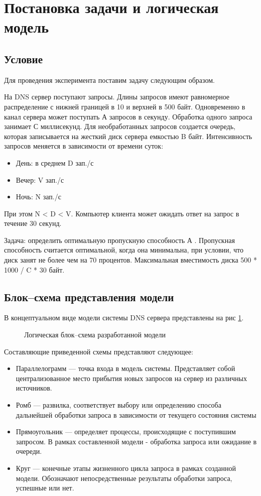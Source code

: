 \newpage
\section{Постановка задачи и логическая модель}
\subsection{Условие}
Для проведения эксперимента поставим задачу следующим образом.

На DNS сервер поступают запросы. Длины запросов имеют равномерное распределение с нижней границей
в 10 и верхней в 500 байт. Одновременно в канал сервера может поступать А запросов в секунду. Обработка одного
запроса занимает С миллисекунд. Для необработанных запросов создается очередь, которая записывается
на жесткий диск сервера емкостью B байт. Интенсивность запросов меняется в зависимости от времени суток:
\begin{itemize}
    \item День: в среднем D зап./с
    \item Вечер: V зап./с
    \item Ночь: N зап./с
\end{itemize}

При этом N < D < V. Компьютер клиента может ожидать ответ на запрос в течение 30 секунд.

Задача: определить оптимальную пропускную способность А . Пропускная способность считается оптимальной, когда она минимальна, при условии,
что диск занят не более чем на 70 процентов. Максимальная вместимость диска 500 * 1000 / C * 30  байт.

\subsection{Блок--схема представления модели}
В концептуальном виде модели системы DNS сервера представлены на рис \ref{concept}.

\begin{figure} [h]
    \caption{Логическая блок--схема разработанной модели}
    \label{concept}
\end{figure}

Составляющие приведенной схемы представляют следующее:
\begin{itemize}
    \item Параллелограмм --- точка входа в модель системы. Представляет собой централизованное
    место прибытия новых запросов на сервер из различных источников.
    \item Ромб --- развилка, соответствует выбору или определению способа дальнейшей
    обработки запроса в зависимости от текущего состояния системы
    \item Прямоугольник --- определяет процессы, происходящие с поступившим запросом.
    В рамках составленной модели - обработка запроса или ожидание в очереди. 
    \item Круг --- конечные этапы жизненного цикла запроса в рамках созданной модели.
    Обозначают непосредственные результаты обработки запроса, успешные или нет.
\end{itemize}
\newpage

